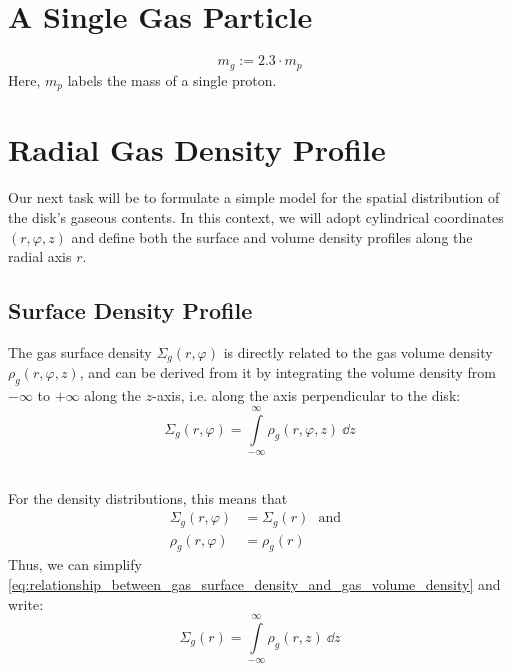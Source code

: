  \\

 \\

\section{A Single Gas Particle}

    \begin{equation}
        m_g
            := 2.3 \cdot m_p
    \end{equation}
    Here, $m_p$ labels the mass of a single proton.

\newpage\section{Radial Gas Density Profile}

    Our next task will be to formulate a simple model for the spatial distribution of the disk's 
    gaseous contents. In this context, we will adopt cylindrical coordinates $(r, \varphi, z)$ and
    define both the surface and volume density profiles along the radial axis $r$.

    \subsection{Surface Density Profile}

        The gas surface density $\Sigma_g(r,\varphi)$ is directly related to the gas volume density
        $\rho_g(r,\varphi,z)$, and can be derived from it by integrating the volume density from 
        $-\infty$ to $+\infty$ along the $z$-axis, i.e. along the axis perpendicular to the disk:
        \begin{equation}
            \label{eq:relationship_between_gas_surface_density_and_gas_volume_density}
            \Sigma_g(r,\varphi)
                = \int\limits_{-\infty}^{\infty} \rho_g(r,\varphi,z)\ \dd z
        \end{equation}

         \\
        For the density distributions, this means that
        \begin{align}
            \Sigma_g(r, \varphi) 
                &= \Sigma_g(r) 
            \ \ \ \text{and}\ \ \
            \\
            \rho_g(r, \varphi) 
                &= \rho_g(r)
        \end{align}
        Thus, we can simplify 
        \cref{eq:relationship_between_gas_surface_density_and_gas_volume_density} and write:
        \begin{equation}
            \Sigma_g(r)
                = \int\limits_{-\infty}^{\infty} \rho_g(r,z)\ \dd z
        \end{equation}
        
